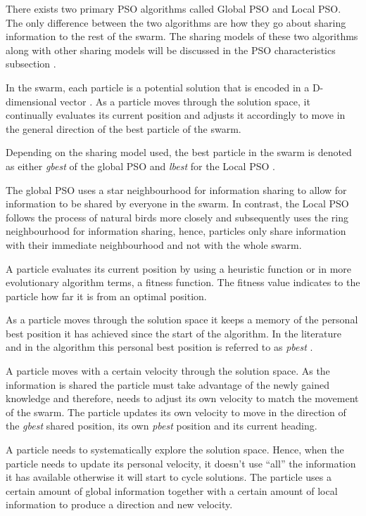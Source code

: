 There exists two primary PSO algorithms called Global PSO and Local PSO. The only difference between the two algorithms are how they go about sharing information to the rest of the swarm. The sharing models of these two algorithms along with other sharing models will be discussed in the PSO characteristics subsection \cite{SOSwarm}.

In the swarm, each particle is a potential solution that is encoded in a D-dimensional vector \cite{PSOHybridJobShop,PSOSelfHierarch}. As a particle moves through the solution space, it continually evaluates its current position and adjusts it accordingly to move in the general direction of the best particle of the swarm. 

Depending on the sharing model used, the best particle in the swarm is denoted as either \emph{gbest} of the global PSO and \emph{lbest} for the Local PSO \cite{SOSwarm,FundamentalSwarm,CompuIntelligenceIntro}. 

The global PSO uses a star neighbourhood for information sharing to allow for information to be shared by everyone in the swarm. In contrast, the Local PSO follows the process of natural birds more closely and subsequently uses the ring neighbourhood for information sharing, hence, particles only share information with their immediate neighbourhood and not with the whole swarm.

A particle evaluates its current position by using a heuristic function or in more evolutionary algorithm terms, a fitness function. The fitness value indicates to the particle how far it is from an optimal position\cite{CompuIntelligenceIntro}. 

As a particle moves through the solution space it keeps a memory of the personal best position it has achieved since the start of the algorithm. In the literature and in the algorithm this personal best position is referred to as \emph{pbest} \cite{SOSwarm}.

A particle moves with a certain velocity through the solution space. As the information is shared the particle must take advantage of the newly gained knowledge and therefore, needs to adjust its own velocity to match the movement of the swarm. The particle updates its own velocity to move in the direction of the \emph{gbest} shared position, its own \emph{pbest} position and its current heading.

A particle needs to systematically explore the solution space. Hence, when the particle needs to update its personal velocity, it doesn't use ``all'' the information it has available otherwise it will start to cycle solutions. The particle uses a certain amount of global information together with a certain amount of local information to produce a direction and new velocity\cite{FundamentalSwarm,CompuIntelligenceIntro,PSOSelfHierarch,SOSwarm}. 

